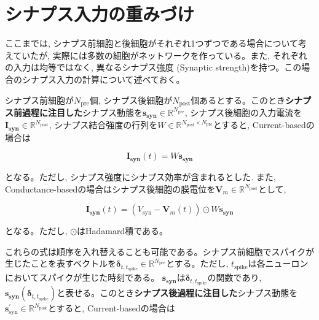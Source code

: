 \section{シナプス入力の重みづけ
}


ここまでは, シナプス前細胞と後細胞がそれぞれ1つずつである場合について考えていたが, 実際には多数の細胞がネットワークを作っている。また, それぞれの入力は均等ではなく, 異なるシナプス強度 (Synaptic strength)を持つ。この場合のシナプス入力の計算について述べておく。



シナプス前細胞が$N_{\text{pre}}$個, シナプス後細胞が$N_{\text{post}}$個あるとする。このとき\textbf{シナプス前過程に注目した}シナプス動態を$\boldsymbol{s_{\text{syn}}}\in \mathbb{R}^{N_{\text{pre}}}$, シナプス後細胞の入力電流を$\boldsymbol{I_{\text{syn}}}\in \mathbb{R}^{N_{\text{post}}}$, シナプス結合強度の行列を$W\in \mathbb{R}^{N_{\text{post}} \times N_{\text{pre}}}$とすると, Current-basedの場合は





\begin{equation}

\boldsymbol{I_{\text{syn}}}(t)=W \boldsymbol{s_{\text{syn}}}  

\end{equation}





となる。ただし, シナプス強度にシナプス効率が含まれるとした. また, Conductance-basedの場合はシナプス後細胞の膜電位を$\boldsymbol{V}_{m}\in \mathbb{R}^{N_{\text{post}}}$として, 





\begin{equation}

\boldsymbol{I_{\text{syn}}}(t)=\left(V_{\text{syn}}-\boldsymbol{V}_{m}(t)\right)\odot W \boldsymbol{s_{\text{syn}}}

\end{equation}





となる。ただし, $\odot$はHadamard積である。



これらの式は順序を入れ替えることも可能である。シナプス前細胞でスパイクが生じたことを表すベクトルを$\boldsymbol{\delta}_{t,t_{\text{spike}}}\in \mathbb{R}^{N_{\text{pre}}}$とする。ただし, $t_{\text{spike}}$は各ニューロンにおいてスパイクが生じた時刻である。 $\boldsymbol{s_{\text{syn}}}$は$\boldsymbol{\delta}_{t,t_{\text{spike}}}$の関数であり, $\boldsymbol{s_{\text{syn}}}(\boldsymbol{\delta}_{t,t_{\text{spike}}})$と表せる。このとき\textbf{シナプス後過程に注目した}シナプス動態を$\boldsymbol{s}^\prime_{\text{syn}}\in \mathbb{R}^{N_{\text{post}}}$とすると, Current-basedの場合は





